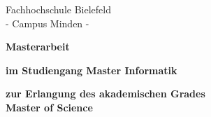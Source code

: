 
\begin{titlepage}

    \vspace{1cm}

    \begin{center}
        \Large{Fachhochschule Bielefeld}\\
        \Large{- Campus Minden -}\\
    \end{center}

    \vspace{2cm}

    \begin{center}
        \doublespacing
        \textbf{\LARGE{Masterarbeit}}
        \singlespacing

        \vspace{0.5cm}

        \textbf{im Studiengang Master Informatik}
    \end{center}

    \vspace{2cm}

    \begin{center}
        \textbf{zur Erlangung des akademischen Grades \\
        Master of Science}
    \end{center}

    \vspace*{\fill}


\end{titlepage}
